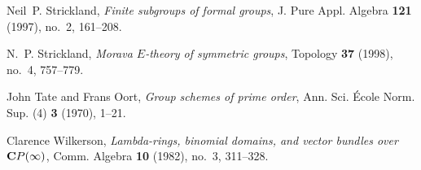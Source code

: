 \documentclass{gtpart}
\theoremstyle{definition}
\theoremstyle{remark}
\begin{document}
\begin{thebibliography}
Neil~P. Strickland, \emph{Finite subgroups of formal groups}, J. Pure Appl.
  Algebra \textbf{121} (1997), no.~2, 161--208. 

N.~P. Strickland, \emph{Morava {$E$}-theory of symmetric groups}, Topology
  \textbf{37} (1998), no.~4, 757--779. 

John Tate and Frans Oort, \emph{Group schemes of prime order}, Ann. Sci.
  {\'E}cole Norm. Sup. (4) \textbf{3} (1970), 1--21. 

Clarence Wilkerson, \emph{Lambda-rings, binomial domains, and vector bundles
  over {${\bf C}P(\infty )$}}, Comm. Algebra \textbf{10} (1982), no.~3,
  311--328. 

\end{thebibliography}
\end{document}
